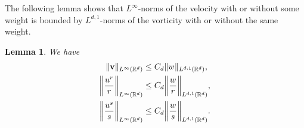 \documentclass[11pt]{amsart}
\newtheorem{lem}[theorem]{Lemma}
\theoremstyle{definition}
\theoremstyle{remark}
\numberwithin{equation}{section}
\numberwithin{equation}{section}
\newcommand{\nrm}[1]{\Vert#1\Vert}
\newcommand{\0}{\emptyset}
\newcommand{\ift}{\infty}
\newcommand{\bfv}{{\bf v}}
\newcommand{\bbR}{\mathbb R}
\begin{document}
The following lemma shows that $L^{\ift}$-norms of the velocity with or without some weight is bounded by $L^{d,1}$-norms of the vorticity with or without the same weight.
	\begin{lem}\label{lem:lwplem}
		We have
		\begin{align}
			\nrm{\bfv}_{L^{\ift}(\bbR^{d})}%
			&\leq C_{d}\nrm{w}_{L^{d,1}(\bbR^{d})},\label{eq:uwLd,1}\\
			\bigg\| \frac{u^{r}}{r}\bigg\|_{L^{\ift}(\bbR^{d})}&\leq C_{d}\bigg\| \frac{w}{r}\bigg\|_{L^{d,1}(\bbR^{d})},\label{eq:uroverrwoverrLd,1}\\
			\bigg\| \frac{u^{s}}{s}\bigg\|_{L^{\ift}(\bbR^{d})}&\leq C_{d}\bigg\| \frac{w}{s}\bigg\|_{L^{d,1}(\bbR^{d})}.\label{eq:usoverswoversLd,1}
		\end{align}
	\end{lem}
	
\end{document}

